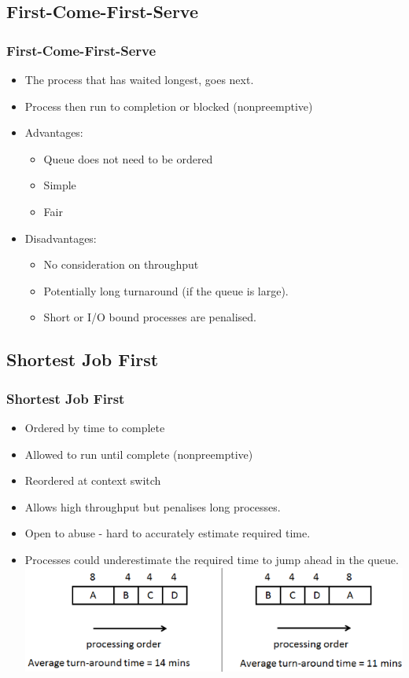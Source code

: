 \documentclass{beamer}
\begin{document}
\subsection{First-Come-First-Serve}
\begin{frame}
\frametitle{First-Come-First-Serve}
\begin{itemize}
\item The process that has waited longest, goes next.
\item Process then run to completion or blocked (nonpreemptive)
\item Advantages:
\begin{itemize}
\item Queue does not need to be ordered
\item Simple
\item Fair
\end{itemize}
\item Disadvantages:
\begin{itemize}
\item No consideration on throughput
\item Potentially long turnaround (if the queue is large).
\item Short or I/O bound processes are penalised.
\end{itemize}
\end{itemize}
\end{frame}
\subsection{Shortest Job First}
\begin{frame}
\frametitle{Shortest Job First}
\begin{itemize}
\item Ordered by time to complete 
\item Allowed to run until complete (nonpreemptive)
\item Reordered at context switch
\item Allows high throughput but penalises long processes.
\item Open to abuse - hard to accurately estimate required time.
\item Processes could underestimate the required time to jump ahead in the queue.
\includegraphics[scale=0.35]{short.png}
\end{itemize}
\end{frame}
\end{document}
